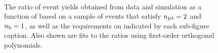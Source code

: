 \begin{figure}[h!]
  \begin{center}
    \\
    \caption{The ratio of event yields obtained from data and simulation as a function of \mht [GeV] based on a sample of \mmj events that satisfy $n_{\text{jet}} = 2$ and $n_{\text{b}} = 1$, as well as the requirements on \scalht indicated by each sub-figure caption. Also shown are fits to the ratios using first-order orthogonal polynomials.}
    \label{fig:mhtval_MuMu_eq2j_eq1b}
  \end{center}
\end{figure}

